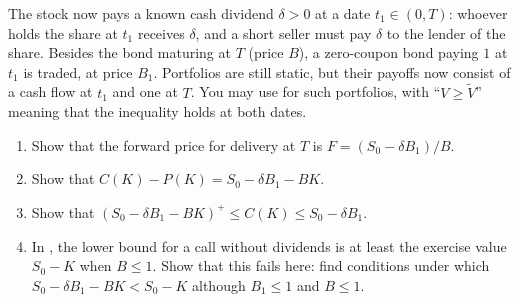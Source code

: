 \begin{exercise}\label{ex:arb-dividend}
\easy The stock now pays a known cash dividend $\delta>0$ at a date $t_1\in(0,T)$: whoever
holds the share at $t_1$ receives $\delta$, and a short seller must pay $\delta$ to the
lender of the share. Besides the bond maturing at $T$ (price $B$), a zero-coupon bond paying
$1$ at $t_1$ is traded, at price $B_1$. Portfolios are still static, but their payoffs now
consist of a cash flow at $t_1$ and one at $T$. You may use  for
such portfolios, with ``$V\ge\tilde V$'' meaning that the inequality holds at both dates.
\begin{enumerate}[label=(\alph*)]
  \item Show that the forward price for delivery at $T$ is $F=(S_0-\delta B_1)/B$.
  \item Show that $C(K)-P(K)=S_0-\delta B_1-BK$.
  \item Show that $(S_0-\delta B_1-BK)^+\le C(K)\le S_0-\delta B_1$.
  \item In , the lower bound for a call without dividends is at least
    the exercise value $S_0-K$ when $B\le1$. Show that this fails here: find conditions under
    which $S_0-\delta B_1-BK<S_0-K$ although $B_1\le1$ and $B\le1$.
\end{enumerate}
\end{exercise}

